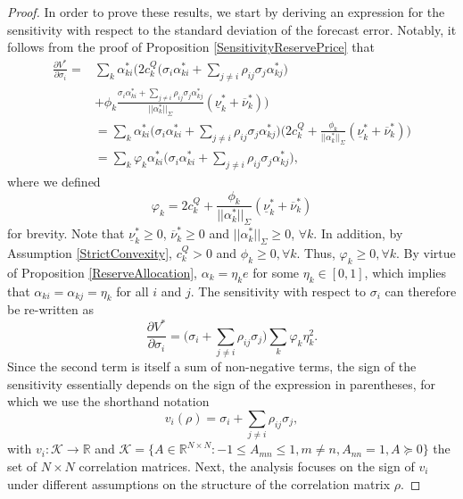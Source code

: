 \documentclass{article}
\begin{document}
\begin{proof} In order to prove these results, we start by deriving an expression for the sensitivity with respect to the standard deviation of the forecast error. Notably, it follows from the proof of Proposition \ref{SensitivityReservePrice} that
\begin{align*}
\frac{\partial V^*}{\partial \sigma_i} =& \sum_k\alpha_{ki}^*\Big(2c_k^Q\big(\sigma_i \alpha_{ki}^* + \sum_{j \ne i} \rho_{ij} \sigma_j\alpha_{kj}^*\big)\\
&+ \phi_k \frac{\sigma_i \alpha_{ki}^* + \sum_{j \ne i} \rho_{ij} \sigma_j \alpha_{kj}^*}{||\alpha_k^*||_{\Sigma}}(\underline{\nu}_k^* + \overline{\nu}_k^*)\Big)\\
&=  \sum_k \alpha_{ki}^* \Big(\sigma_i \alpha_{ki}^* + \sum_{j \ne i} \rho_{ij} \sigma_j\alpha_{kj}^*\Big)\Big(2c_k^Q + \frac{\phi_k}{||\alpha_k^*||_{\Sigma}}(\underline{\nu}_k^* + \overline{\nu}_k^*)\Big)\\
&= \sum_k \varphi_k \alpha_{ki}^* \Big(\sigma_i \alpha_{ki}^* + \sum_{j \ne i} \rho_{ij} \sigma_j\alpha_{kj}^*\Big),
\end{align*}
where we defined
\begin{equation*}
\varphi_k = 2c_k^Q + \frac{\phi_k}{||\alpha_k^*||_{\Sigma}}(\underline{\nu}_k^* + \overline{\nu}_k^*)
\end{equation*}
for brevity. Note that $\underline{\nu}_k^* \ge 0$, $\overline{\nu}_k^* \ge 0$ and $||\alpha_k^*||_{\Sigma} \ge 0$, $\forall k$. In addition, by Assumption \ref{StrictConvexity}, $c_k^Q > 0$ and $\phi_k \ge 0, \forall k$. Thus, $\varphi_k \ge 0, \forall k$. By virtue of Proposition \ref{ReserveAllocation}, $\alpha_k = \eta_k e$ for some $\eta_k \in [0, 1]$, which implies that $\alpha_{ki} = \alpha_{kj} = \eta_k$ for all $i$ and $j$. The sensitivity with respect to $\sigma_i$ can therefore be re-written as
\begin{equation*}
\frac{\partial V^*}{\partial \sigma_i} = \bigg(\sigma_i + \sum_{j \ne i} \rho_{ij} \sigma_j \bigg)\sum_k \varphi_k \eta_k^2.
\end{equation*}
Since the second term is itself a sum of non-negative terms, the sign of the sensitivity essentially depends on the sign of the expression in parentheses, for which we use the shorthand notation
\begin{equation*}
v_{i}(\rho) = \sigma_i + \sum_{j \ne i} \rho_{ij} \sigma_j,
\end{equation*}
with $v_{i}: \mathcal{K} \rightarrow \mathbb{R}$ and $\mathcal{K} = \{A \in \mathbb{R}^{N \times N}: -1 \le A_{mn} \le 1, m \ne n, A_{nn} = 1, A \succeq 0\}$ the set of $N \times N$ correlation matrices. Next, the analysis focuses on the sign of $v_i$ under different assumptions on the structure of the correlation matrix $\rho$.

\end{proof}
\end{document}
